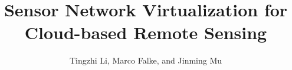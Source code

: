 \documentclass[journal]{IEEEtran}
\begin{document}
%
\title{Sensor Network Virtualization for Cloud-based Remote Sensing}
%
%
%

\author{Tingzhi Li, Marco Falke, and Jinming Mu}%


% 
%



\end{document}
